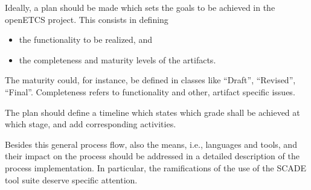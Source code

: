 \documentclass{template/openetcs_article}
\begin{document}
Ideally, a plan should be made which sets the goals to be achieved
in the openETCS project. This consists in defining  
\begin{itemize}
\item the functionality to be realized, and
\item the completeness and maturity levels of the artifacts. 
\end{itemize}
The maturity could, for instance, be defined in classes like
``Draft'', ``Revised'', ``Final''. Completeness refers to
functionality and other, artifact specific issues. 

The plan should define a timeline which states which grade shall be
achieved at which stage, and add corresponding activities.

Besides this general process flow, also the means, i.e., languages and
tools, and their impact on the process should be addressed in a
detailed description of the process implementation. In particular, the
ramifications of the use of the SCADE tool suite deserve specific attention.
\end{document}
